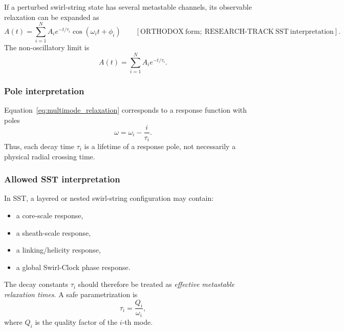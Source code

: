         If a perturbed swirl-string state has several metastable channels, its observable relaxation can be expanded as
        \begin{equation}
            \boxed{
                A(t)
                =
                \sum_{i=1}^{N}
                A_i
                e^{-t/\tau_i}
                \cos(\omega_i t+\phi_i)
            }
            \qquad
            [\mathrm{ORTHODOX\ form;\ RESEARCH\text{-}TRACK\ SST\ interpretation}].
            \label{eq:multimode_relaxation}
        \end{equation}
        The non-oscillatory limit is
        \begin{equation}
            A(t)
            =
            \sum_{i=1}^{N}
            A_i e^{-t/\tau_i}.
            \label{eq:multigroup_decay}
        \end{equation}
    
    \subsubsection*{Pole interpretation}
        
        Equation~\eqref{eq:multimode_relaxation} corresponds to a response function with poles
        \begin{equation}
            \omega
            =
            \omega_i
            -
            \frac{i}{\tau_i}.
            \label{eq:response_poles}
        \end{equation}
        Thus, each decay time \(\tau_i\) is a lifetime of a response pole, not necessarily a physical radial crossing time.
    
    \subsubsection*{Allowed SST interpretation}
        
        In SST, a layered or nested swirl-string configuration may contain:
        \begin{itemize}
            \item a core-scale response,
            \item a sheath-scale response,
            \item a linking/helicity response,
            \item a global Swirl-Clock phase response.
        \end{itemize}
        The decay constants \(\tau_i\) should therefore be treated as \emph{effective metastable relaxation times}. A safe parametrization is
        \begin{equation}
            \tau_i
            =
            \frac{Q_i}{\omega_i},
            \label{eq:tau_Q_over_omega}
        \end{equation}
        where \(Q_i\) is the quality factor of the \(i\)-th mode.
    
